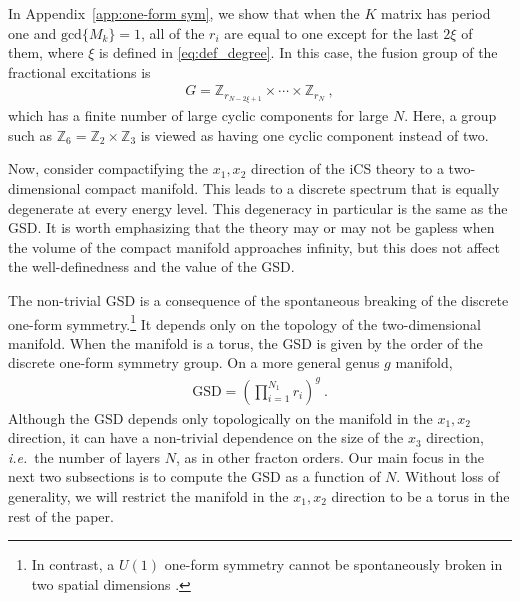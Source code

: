 \documentclass[aps,prb,twocolumn,superscriptaddress,floatfix,10pt,nofootinbib]{revtex4-2}
\newcommand{\ie}{\begin{equation}\begin{aligned}}
\newcommand{\fe}{\end{aligned}\end{equation}}
\theoremstyle{definition}
\begin{document}
In Appendix~\ref{app:one-form sym}, we show that when the $K$ matrix has period one and $\text{gcd}\{M_k\}=1$, all of the $r_i$ are equal to one except for the last $2\xi$ of them, where $\xi$ is defined in \eqref{eq:def_degree}. In this case, the fusion group of the fractional excitations is
\ie
G=\mathbb{Z}_{r_{N-2\xi+1}}\times\cdots\times\mathbb{Z}_{r_N}~,
\fe
which has a finite number of large cyclic components for large $N$. Here, a group such as $\mathbb{Z}_6=\mathbb{Z}_2\times\mathbb{Z}_3$ is viewed as having one cyclic component instead of two.

Now, consider compactifying the $x_1,x_2$ direction of the iCS theory to a two-dimensional compact manifold. This leads to a discrete spectrum that is equally degenerate at every energy level. This degeneracy in particular is the same as the GSD. It is worth emphasizing that the theory may or may not be gapless when the volume of the compact manifold approaches infinity, but this does not affect the well-definedness and the value of the GSD. 

The non-trivial GSD is a consequence of the spontaneous breaking of the discrete one-form symmetry.\footnote{In contrast, a $U(1)$ one-form symmetry cannot be spontaneously broken in two spatial dimensions \cite{Gaiotto_2015,Lake:2018dqm}.} It depends only on the topology of the two-dimensional manifold. When the manifold is a torus, the GSD is given by the order of the discrete one-form symmetry group. On a more general genus $g$ manifold, 
\ie\label{eq:GSD_SNF}
\text{GSD}=\left(\prod_{i=1}^{N_1} r_i\right)^g~.
\fe
Although the GSD depends only topologically on the manifold in the $x_1,x_2$ direction, it can have a non-trivial dependence on the size of the $x_3$ direction, \textit{i.e.}\ the number of layers $N$, as in other fracton orders. Our main focus in the next two subsections is to compute the GSD as a function of $N$. Without loss of generality, we will restrict the manifold in the $x_1,x_2$ direction to be a torus in the rest of the paper.
\end{document}
